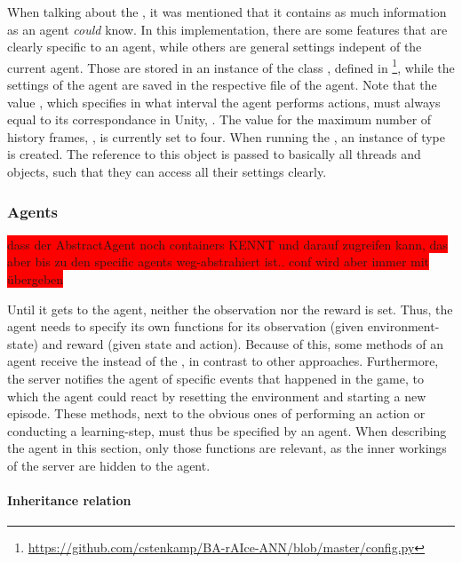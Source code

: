 When talking about the , it was mentioned that it contains as much information as an agent \textit{could} know. In this implementation, there are some features that are clearly specific to an agent, while others are general settings indepent of the current agent. Those are stored in an instance of the class , defined in \footnote{\url{https://github.com/cstenkamp/BA-rAIce-ANN/blob/master/config.py}}, while the settings of the agent are saved in the respective file of the agent. Note that the value , which specifies in what interval the agent performs actions, must always equal to its correspondance in Unity, . The value for the maximum number of history frames, , is currently set to four. When running the , an instance  of type  is created. The reference to this object is passed to basically all threads and objects, such that they can access all their settings clearly.


\subsubsection{Agents}

\colorbox{red}{dass der AbstractAgent noch containers KENNT und darauf zugreifen kann, das aber bis zu den specific agents weg-abstrahiert ist.. conf wird aber immer mit übergeben}

Until it gets to the agent, neither the observation nor the reward is set. Thus, the agent needs to specify its own functions for its observation (given environment-state) and reward (given state and action). Because of this, some methods of an agent receive the  instead of the , in contrast to other approaches. Furthermore, the server notifies the agent of specific events that happened in the game, to which the agent could react by resetting the environment and starting a new episode. These methods, next to the obvious ones of performing an action or conducting a learning-step, must thus be specified by an agent. When describing the agent in this section, only those functions are relevant, as the inner workings of the server are hidden to the agent.

\paragraph{Inheritance relation}

